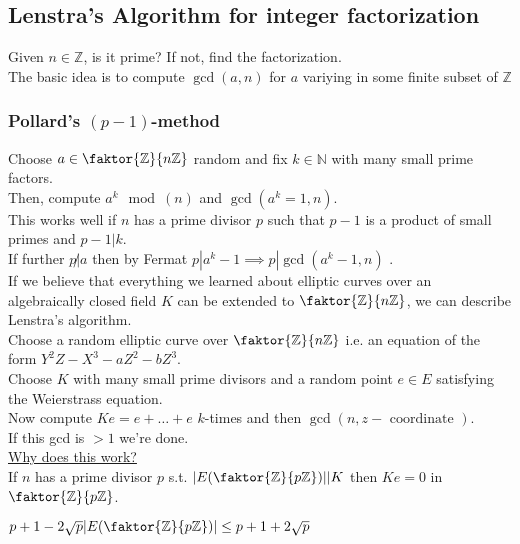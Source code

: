 \documentclass[../main.tex]{subfiles}
\begin{document}
\subsection*{Lenstra's Algorithm for integer factorization}
Given $n\in \mathbb{Z}$, is it prime? If not, find the factorization.\\
The basic idea is to compute $\gcd( a,n) $ for $a$ variying in some finite subset of $ \mathbb{Z}$ 
\subsubsection*{Pollard's $( p-1) $-method }
Choose $a \in \faktor{\mathbb{Z}}{n \mathbb{Z}}$ random and fix $k\in \mathbb{N}$ with many small prime factors.\\
Then, compute $a^{k}\mod ( n) $ and $\gcd( a^{k}=1,n) $.\\
This works well if $n$ has a prime divisor $p$ such that $p-1$ is a product of small primes and $p-1|k$.\\
If further $p\not| a $ then by Fermat $p|a^{k}-1\implies p| \gcd( a^{k}-1,n) $ .\\
If we believe that everything we learned about elliptic curves over an algebraically closed field $K$ can be extended to $ \faktor{\mathbb{Z}}{n \mathbb{Z}}$, we can describe Lenstra's algorithm.\\
Choose a random elliptic curve over $ \faktor{\mathbb{Z}}{n \mathbb{Z}}$ i.e. an equation of the form $ Y^{2}Z-X^{3}-aZ^{2}-bZ^{3}$.\\
Choose $K$ with many small prime divisors and a random point $e\in E$ satisfying the Weierstrass equation.\\
Now compute $Ke= e+ \ldots+e$ $k$-times and then $\gcd( n, z- \text{ coordinate } ) $.\\
If this gcd is $>1$ we're done.\\
\underline{Why does this work?}\\
If $n$ has a prime divisor $p$ s.t. $|E( \faktor{\mathbb{Z}}{p\mathbb{Z}})| | K$ then $Ke=0$ in $ \faktor{\mathbb{Z}}{p \mathbb{Z}}$.\\
\begin{rmq}
	$ p+1- 2 \sqrt{p}  | E ( \faktor{\mathbb{Z}}{p \mathbb{Z}}) | \leq  p+1+ 2 \sqrt{p}  $ 

\end{rmq}



	

	
\end{document}
